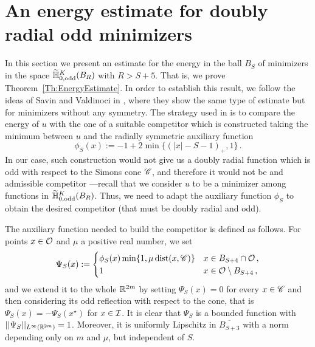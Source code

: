 \section{An energy estimate for doubly radial odd minimizers}
\label{Sec:EnergyEstimate}

In this section we present an estimate for the energy in the ball $B_S$ of minimizers in the space $\widetilde{\mathbb{H}}^K_{0, \mathrm{odd}}(B_R)$ with $R > S+ 5$. That is, we prove Theorem~\ref{Th:EnergyEstimate}. In order to establish this result, we follow the ideas of Savin and Valdinoci in \cite{SavinValdinoci-EnergyEstimate}, where they show the same type of estimate but for minimizers without any symmetry. The strategy used in \cite{SavinValdinoci-EnergyEstimate} is to compare the energy of $u$ with the one of a suitable competitor which is constructed taking the minimum between $u$ and the radially symmetric auxiliary function
\begin{equation}
	\label{Eq:DefPhiS}
	\phi_S (x) :=-1+2\min\{(|x|-S-1)_+,1\}\,.
\end{equation}
In our case, such construction would not give us a doubly radial function which is odd with respect to the Simons cone $\mathscr{C}$, and therefore it would not be and admissible competitor ---recall that we consider $u$ to be a minimizer among functions in $\widetilde{\mathbb{H}}^K_{0, \mathrm{odd}}(B_R)$. Thus, we need to adapt the auxiliary function $\phi_S$ to obtain the desired  competitor (that must be doubly radial and odd).

The auxiliary function needed to build the competitor is defined as follows. For points $x\in \mathcal{O}$ and $\mu$ a positive real number, we set
\begin{equation}
	\label{Eq:DefPsiS}
\Psi_S(x) := 
\begin{cases}
\phi_S (x) \min \{1,\mu\operatorname{dist}(x,\mathscr{C})\} &  x \in B_{S+4}\cap \mathcal{O}\,, \\
1 &  x \in \mathcal{O} \setminus B_{S+4}\,,
\end{cases}
\end{equation}
and we extend it to the whole $\mathbb{R}^{2m}$ by setting $\Psi_S (x)=0$ for every $x\in \mathscr{C}$ and then considering its odd reflection with respect to the cone, that is $\Psi_S(x) = -\Psi_S(x^\star)$ for $x\in \mathcal{I}$. It is clear that $\Psi_S$ is a bounded function with $||\Psi_S||_{L^\infty(\mathbb{R}^{2m})}=1$. Moreover, it is uniformly Lipschitz in $\overline{B_{S+3}}$ with a norm depending only on $m$ and $\mu$, but independent of $S$.

